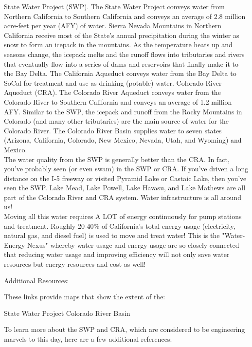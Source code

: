\documentclass{article}
\begin{document}
State Water Project (SWP).  The State Water Project conveys water from Northern California to Southern California and conveys an average of 2.8 million acre-feet per year (AFY) of water.  Sierra Nevada Mountains in Northern California receive most of the State's annual precipitation during the winter as snow to form an icepack in the mountains.  As the temperature heats up and seasons change, the icepack melts and the runoff flows into tributaries and rivers that eventually flow into a series of dams and reservoirs that finally make it to the Bay Delta.  The California Aqueduct conveys water from the Bay Delta to SoCal for treatment and use as drinking (potable) water.
Colorado River Aqueduct (CRA).  The Colorado River Aqueduct conveys water from the Colorado River to Southern California and conveys an average of 1.2 million AFY.  Similar to the SWP, the icepack and runoff from the Rocky Mountains in Colorado (and many other tributaries) are the main source of water for the Colorado River.  The Colorado River Basin supplies water to seven states (Arizona, California, Colorado, New Mexico, Nevada, Utah, and Wyoming) and Mexico.\\
\vspace{1cm}
The water quality from the SWP is generally better than the CRA.  In fact, you've probably seen (or even swam) in the SWP or CRA.  If you've driven a long distance on the I-5 freeway or visited Pyramid Lake or Castaic Lake, then you've seen the SWP.  Lake Mead, Lake Powell, Lake Havasu, and Lake Mathews are all part of the Colorado River and CRA system.  Water infrastructure is all around us!\\
\vspace{1cm}
Moving all this water requires A LOT of energy continuously for pump stations and treatment.  Roughly 20-40\% of California's total energy usage (electricity, natural gas, and diesel fuel) is used to move and treat water!  This is the "Water-Energy Nexus" whereby water usage and energy usage are so closely connected that reducing water usage and improving efficiency will not only save water resources but energy resources and cost as well!\\

\vspace{1cm}


Additional Resources:

These links provide maps that show the extent of the:

State Water Project
Colorado River Basin

To learn more about the SWP and CRA, which are considered to be engineering marvels to this day, here are a few additional references:
\end{document}
